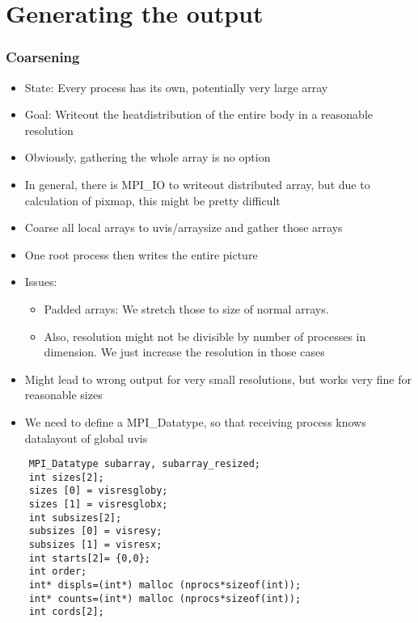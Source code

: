 \section{Generating the output}
\begin{frame}
  \frametitle{Coarsening}
  \begin{itemize}
  \item State: Every process has its own, potentially very large array
  \item Goal: Writeout the heatdistribution of the entire body in a reasonable resolution
  \item Obviously, gathering the whole array is no option
  \item In general, there is MPI\_IO to writeout distributed array, but due to calculation of pixmap, this might be pretty difficult
  \end{itemize}
\end{frame}

\begin{frame}
  \begin{itemize}
  \item Coarse all local arrays to uvis/arraysize and gather those arrays
  \item One root process then writes the entire picture
  \item Issues:
    \begin{itemize}
    \item Padded arrays: We stretch those to size of normal arrays.
    \item Also, resolution might not be divisible by number of processes in dimension. We just increase the resolution in those cases
    \end{itemize}
  \item Might lead to wrong output for very small resolutions, but works very fine for reasonable sizes
  \item We need to define a MPI\_Datatype, so that receiving process knows datalayout of global uvis
  \end{itemize}
\end{frame}

\begin{frame}[fragile]
  \begin{lstlisting}
    MPI_Datatype subarray, subarray_resized;
    int sizes[2];
    sizes [0] = visresgloby;
    sizes [1] = visresglobx;
    int subsizes[2];
    subsizes [0] = visresy;
    subsizes [1] = visresx;
    int starts[2]= {0,0};
    int order;
    int* displs=(int*) malloc (nprocs*sizeof(int));
    int* counts=(int*) malloc (nprocs*sizeof(int));
    int cords[2];
  \end{lstlisting}
\end{frame}




